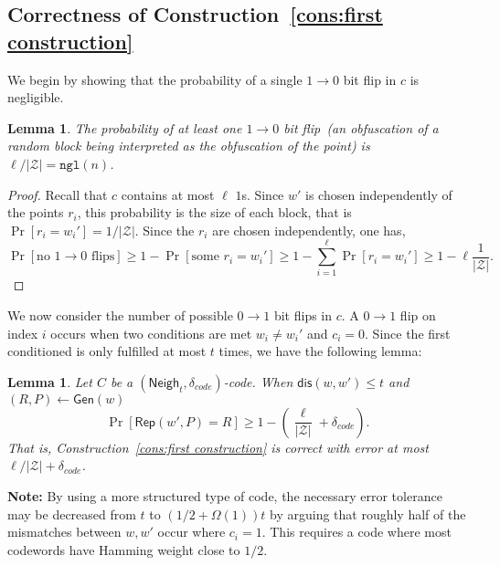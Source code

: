 \documentclass[11pt]{article}
\newcommand{\consref}[1]{\mbox{Construction~\ref{#1}}}
\newcommand{\class}[1]{{\ensuremath{\mathsf{#1}}}}
\newcommand{\gen}{\ensuremath{\class{Gen}}\xspace}
\newcommand{\rep}{\ensuremath{\class{Rep}}\xspace}
\newcommand{\neigh}{\ensuremath{\class{Neigh}}\xspace}
\newcommand{\dis}{\ensuremath{\mathsf{dis}}}
\newcommand{\ngl}{\ensuremath{\mathtt{ngl}}\xspace}
\newtheorem{lemma}[theorem]{Lemma}
\begin{document}
\subsection{Correctness of \consref{cons:first construction}}
\label{sec:correct first cons}
We begin by showing that the probability of a single $1\rightarrow 0$ bit flip in $c$ is negligible.
\begin{lemma}
\label{lem:no 1 to 0 flips}
The probability of at least one $1\rightarrow 0$ bit flip~(an obfuscation of a random block being interpreted as the obfuscation of the point) is $ \ell/|\mathcal{Z}| = \ngl(n)$.
\end{lemma}
\begin{proof}
Recall that $c$ contains at most $\ell$ $1$s.  Since $w'$ is chosen independently of the points $r_i$, this probability is the size of each block, that is $\Pr[r_i =w_i']  = 1/|\mathcal{Z}|$. Since the $r_i$ are chosen independently, one has,
\[
\Pr[\text{no $1\rightarrow 0$ flips}] \geq 1-\Pr[\text{some }r_i = w_i']\geq 1-\sum_{i=1}^\ell \Pr[r_i = w_i'] \geq 1-\ell \frac{1}{|\mathcal{Z}|}.
\]
\end{proof}

We now consider the number of possible $0\rightarrow 1$ bit flips in $c$.  A $0\rightarrow 1$ flip on index $i$ occurs when two conditions are met $w_i\neq w_i'$ and $c_i = 0$.  Since the first conditioned is only fulfilled at most $t$ times, we have the following lemma:

\begin{lemma}
\label{lem:correct of cons}
Let $C$ be a $(\neigh_t, \delta_{code})$-code.  When $\dis(w, w')\leq t$ and $(R, P)\leftarrow \gen(w)$
\[
\Pr[\rep( w', P) = R] \geq 1-\left(\frac{\ell}{|\mathcal{Z}|}+\delta_{code}\right).
\]
That is, \consref{cons:first construction} is correct with error at most $\ell/|\mathcal{Z}|+\delta_{code}$.
\end{lemma}

\textbf{Note: }By using a more structured type of code, the necessary error tolerance may be decreased from $t$ to  $(1/2+\Omega(1))t$ by arguing that roughly half of the mismatches between $w, w'$ occur where $c_i =1$.  This requires a code where most codewords have Hamming weight close to $1/2$.
\end{document}
